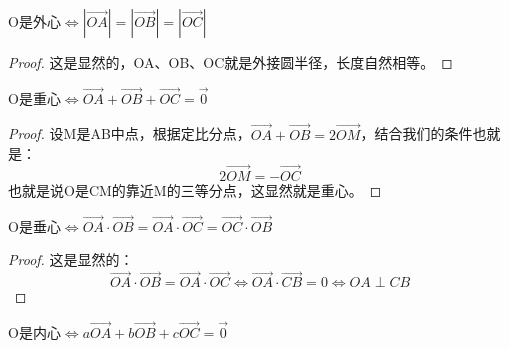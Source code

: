 \begin{theorem}
    O是外心$\iff |\overrightarrow{OA}| = |\overrightarrow{OB}| = |\overrightarrow{OC}|$
\end{theorem}

\begin{proof}
    这是显然的，OA、OB、OC就是外接圆半径，长度自然相等。
\end{proof}

\begin{theorem}
    O是重心$\iff \overrightarrow{OA} + \overrightarrow{OB} + \overrightarrow{OC} = \overrightarrow{0}$
\end{theorem}

\begin{proof}
    设M是AB中点，根据定比分点，$\overrightarrow{OA} + \overrightarrow{OB} = 2 \overrightarrow{OM}$，结合我们的条件也就是：
    $$
        2 \overrightarrow{OM} = -\overrightarrow{OC}
    $$
    也就是说O是CM的靠近M的三等分点，这显然就是重心。
\end{proof}

\begin{theorem}
    O是垂心$\iff \overrightarrow{OA} \cdot \overrightarrow{OB} = \overrightarrow{OA} \cdot \overrightarrow{OC} = \overrightarrow{OC} \cdot \overrightarrow{OB}$
\end{theorem}

\begin{proof}
    这是显然的：
    $$
        \overrightarrow{OA} \cdot \overrightarrow{OB} = \overrightarrow{OA} \cdot \overrightarrow{OC} \iff \overrightarrow{OA} \cdot \overrightarrow{CB} = 0 \iff OA \perp CB
    $$
\end{proof}

\begin{theorem}
    O是内心$\iff a\overrightarrow{OA} + b\overrightarrow{OB} + c\overrightarrow{OC} = \overrightarrow{0}$
\end{theorem}

